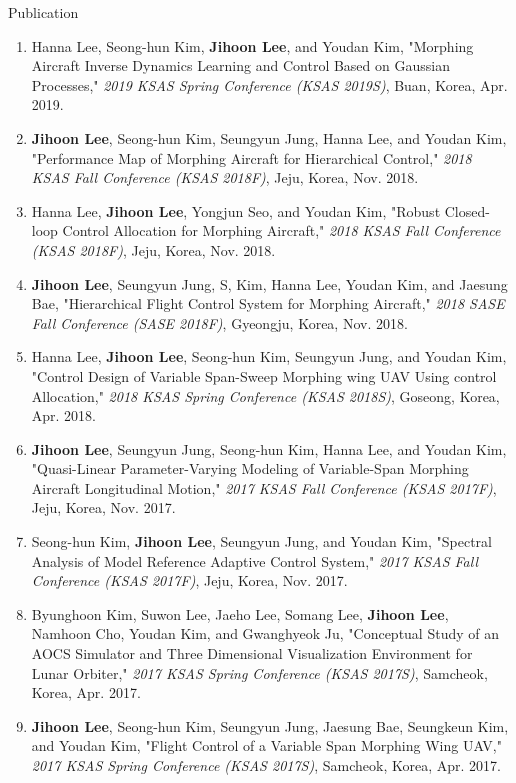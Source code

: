 \documentclass{resume}
\begin{document}
\begin{rSection}{Publication}
\begin{enumerate}
		\item Hanna Lee, Seong-hun Kim, \textbf{Jihoon Lee}, and Youdan Kim, "Morphing Aircraft Inverse Dynamics Learning and Control Based on Gaussian Processes," \textit{2019 KSAS Spring Conference (KSAS 2019S)}, Buan, Korea, Apr. 2019. 
		
		\item \textbf{Jihoon Lee}, Seong-hun Kim, Seungyun Jung, Hanna Lee, and Youdan Kim, "Performance Map of Morphing Aircraft for Hierarchical Control," \textit{2018 KSAS Fall Conference (KSAS 2018F)}, Jeju, Korea, Nov. 2018. 
		
		\item Hanna Lee, \textbf{Jihoon Lee}, Yongjun Seo, and Youdan Kim, "Robust Closed-loop Control Allocation for Morphing Aircraft," \textit{2018 KSAS Fall Conference (KSAS 2018F)}, Jeju, Korea, Nov. 2018. 
		
		\item \textbf{Jihoon Lee}, Seungyun Jung, S, Kim, Hanna Lee, Youdan Kim, and Jaesung Bae, "Hierarchical Flight Control System for Morphing Aircraft," \textit{2018 SASE Fall Conference (SASE 2018F)}, Gyeongju, Korea, Nov. 2018. 
		
		\item Hanna Lee, \textbf{Jihoon Lee}, Seong-hun Kim, Seungyun Jung, and Youdan Kim, "Control Design of Variable Span-Sweep Morphing wing UAV Using control Allocation," \textit{2018 KSAS Spring Conference (KSAS 2018S)}, Goseong, Korea, Apr. 2018. 
		
		\item \textbf{Jihoon Lee}, Seungyun Jung, Seong-hun Kim, Hanna Lee, and Youdan Kim, "Quasi-Linear Parameter-Varying Modeling of Variable-Span Morphing Aircraft Longitudinal Motion," \textit{2017 KSAS Fall Conference (KSAS 2017F)}, Jeju, Korea, Nov. 2017. 
		
		\item Seong-hun Kim, \textbf{Jihoon Lee}, Seungyun Jung, and Youdan Kim, "Spectral Analysis of Model Reference Adaptive Control System," \textit{2017 KSAS Fall Conference (KSAS 2017F)}, Jeju, Korea, Nov. 2017. 
		
		\item Byunghoon Kim, Suwon Lee, Jaeho Lee, Somang Lee, \textbf{Jihoon Lee}, Namhoon Cho, Youdan Kim, and Gwanghyeok Ju, "Conceptual Study of an AOCS Simulator and Three Dimensional Visualization Environment for Lunar Orbiter," \textit{2017 KSAS Spring Conference (KSAS 2017S)}, Samcheok, Korea, Apr. 2017. 
		
		\item \textbf{Jihoon Lee}, Seong-hun Kim, Seungyun Jung, Jaesung Bae, Seungkeun Kim, and Youdan Kim, "Flight Control of a Variable Span Morphing Wing UAV," \textit{2017 KSAS Spring Conference (KSAS 2017S)}, Samcheok, Korea, Apr. 2017. 
		

\end{enumerate}
\end{rSection}
\end{document}
